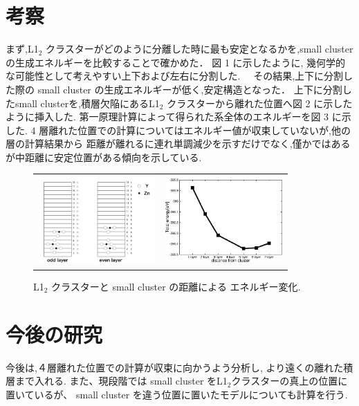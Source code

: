 \documentclass[a4j,twocolumn]{jsarticle}
\begin{document}
\section{考察}
まず,L1$_2$ クラスターがどのように分離した時に最も安定となるかを,small cluster の生成エネルギーを比較することで確かめた．
図 1 に示したように, 幾何学的な可能性として考えやすい上下および左右に分割した.　
その結果,上下に分割した際の small cluster の生成エネルギーが低く,安定構造となった．
上下に分割したsmall clusterを,積層欠陥にあるL1$_2$ クラスターから離れた位置へ図 2 に示したように挿入した. 
第一原理計算によって得られた系全体のエネルギーを図 3 に示した. 4 層離れた位置での計算についてはエネルギー値が収束していないが,他の層の計算結果から 距離が離れるに連れ単調減少を示すだけでなく,僅かではあるが中距離に安定位置がある傾向を示している. 



\begin{figure}
    \begin{tabular}{cc}
      \begin{minipage}{0.5\hsize}
        \centering
        \includegraphics[width=45mm]{small_cluster_slab.png}
        \caption{計算モデルの模式図.}
        \label{default}
      \end{minipage} &
      \begin{minipage}{0.5\hsize}
        \centering
        \includegraphics[width=45mm]{small_cluster.eps}
        \caption{L1$_2$ クラスターと small cluster の距離による エネルギー変化.}
        \label{default}
      \end{minipage}
    \end{tabular}
  \end{figure}

\section{今後の研究}
今後は,４層離れた位置での計算が収束に向かうよう分析し, より遠くの離れた積層まで入れる.
また、現段階では small cluster をL1$_2$クラスターの真上の位置に置いているが、 small cluster を違う位置に置いたモデルについても計算を行う.
\end{document}
